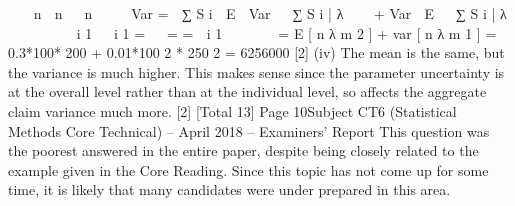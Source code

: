 
  n
 n 
 n
 
 
Var
=
 ∑ S i  E  Var   ∑ S i | λ    + Var  E   ∑ S i | λ   
 
   i 1
  i 1 =
 
=
=
 i 1
  
  
= E [ n λ m 2 ] + var [ n λ m 1 ]
= 0.3*100* 200 + 0.01*100 2 * 250 2
= 6256000
[2]
(iv)
The mean is the same, but the variance is much higher. This makes sense
since the parameter uncertainty is at the overall level rather than at the
individual level, so affects the aggregate claim variance much more.
[2]
[Total 13]
Page 10Subject CT6 (Statistical Methods Core Technical) – April 2018 – Examiners’ Report
This question was the poorest answered in the entire paper, despite
being closely related to the example given in the Core Reading. Since
this topic has not come up for some time, it is likely that many
candidates were under prepared in this area.
